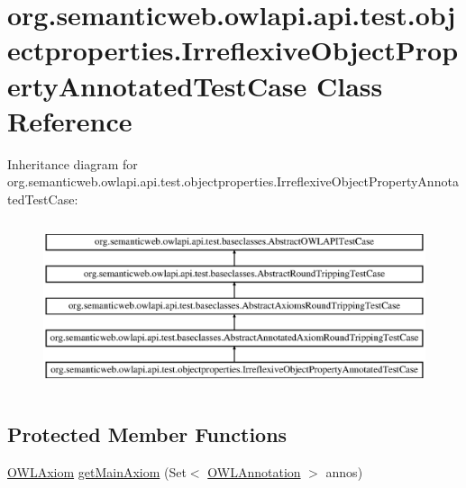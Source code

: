 \hypertarget{classorg_1_1semanticweb_1_1owlapi_1_1api_1_1test_1_1objectproperties_1_1_irreflexive_object_property_annotated_test_case}{\section{org.\-semanticweb.\-owlapi.\-api.\-test.\-objectproperties.\-Irreflexive\-Object\-Property\-Annotated\-Test\-Case Class Reference}
\label{classorg_1_1semanticweb_1_1owlapi_1_1api_1_1test_1_1objectproperties_1_1_irreflexive_object_property_annotated_test_case}
}
Inheritance diagram for org.\-semanticweb.\-owlapi.\-api.\-test.\-objectproperties.\-Irreflexive\-Object\-Property\-Annotated\-Test\-Case\-:\begin{figure}[H]
\begin{center}
\leavevmode
\includegraphics[height=5.000000cm]{classorg_1_1semanticweb_1_1owlapi_1_1api_1_1test_1_1objectproperties_1_1_irreflexive_object_property_annotated_test_case}
\end{center}
\end{figure}
\subsection*{Protected Member Functions}
\begin{DoxyCompactItemize}
\item 
\hyperlink{interfaceorg_1_1semanticweb_1_1owlapi_1_1model_1_1_o_w_l_axiom}{O\-W\-L\-Axiom} \hyperlink{classorg_1_1semanticweb_1_1owlapi_1_1api_1_1test_1_1objectproperties_1_1_irreflexive_object_property_annotated_test_case_a4517cfd070c4228bb637718abbbb621e}{get\-Main\-Axiom} (Set$<$ \hyperlink{interfaceorg_1_1semanticweb_1_1owlapi_1_1model_1_1_o_w_l_annotation}{O\-W\-L\-Annotation} $>$ annos)
\end{DoxyCompactItemize}
